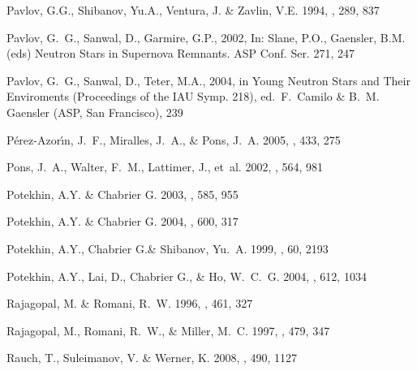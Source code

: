 \documentclass{aa}
\begin{document}
\begin{thebibliography}{}
 {Pavlov}, G.G., {Shibanov}, Yu.A., {Ventura}, J. 
\& {Zavlin}, V.E. 1994, \aap, 289, 837 
 
{Pavlov}, G.~G., {Sanwal}, D., {Garmire}, G.P.,  2002, In: Slane, P.O., 
Gaensler, B.M. (eds) Neutron Stars in Supernova Remnants. ASP Conf. Ser. 271, 
247 
 
{Pavlov}, G.~G., {Sanwal}, D., {Teter}, M.A.,  2004, in 
Young Neutron Stars and Their Enviroments (Proceedings of the 
IAU Symp. 218), ed.\ F.~Camilo \& B.~M. Gaensler 
(ASP, San Francisco), 239 
 
{P\'erez-Azor\'{\i}n}, J.~F., {Miralles}, J.~A., \& {Pons}, J.~A. 
2005, 
\aap, 433, 275 
 
{Pons}, J.~A., {Walter}, F.~M., {Lattimer}, J., {et~al.} 2002, 
\apj, 564, 981 
 
{Potekhin}, A.Y. \& {Chabrier} G. 
2003, \apj, 585, 955 
 
{Potekhin}, A.Y. \& {Chabrier} G. 
2004, \apj, 600, 317 
 
{Potekhin}, A.Y., {Chabrier} G.\& {Shibanov}, Yu.~A. 
1999, \pre, 60, 2193 
 
{Potekhin}, A.Y., {Lai}, D., {Chabrier} G., \& {Ho}, W.~C.~G. 
2004, \apj, 612, 1034 
 
{Rajagopal}, M. \& {Romani}, R.~W. 1996, \apj, 461, 327 
 
{Rajagopal}, M., {Romani}, R.~W., \& {Miller}, M.~C. 1997, \apj, 479, 347 
 
{Rauch}, T., {Suleimanov}, V. \& {Werner}, K. 
  2008, \aap, 490, 1127 
 

\end{thebibliography}
\end{document}

